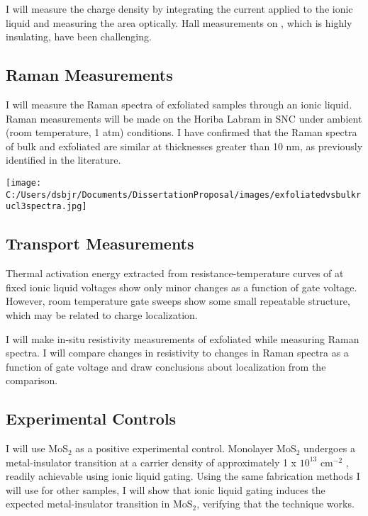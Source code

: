\documentclass[11pt]{article}
\newenvironment{Figure}
  {\par\medskip\noindent\minipage{\linewidth}}
  {\endminipage\par\medskip}
\begin{document}
\begin{multicols}{2}
I will measure the charge density by integrating the current applied to the ionic liquid and measuring the area optically. Hall measurements on \ruclnospace, which is highly insulating, have been challenging.

\subsection{Raman Measurements}

I will measure the Raman spectra of exfoliated \rucl samples through an ionic liquid. Raman measurements will be made on the Horiba Labram in SNC under ambient (room temperature, 1 atm) conditions. I have confirmed that the Raman spectra of bulk and exfoliated \rucl are similar at thicknesses greater than 10 nm, as previously identified in the literature.

\begin{Figure}
		{\texttt{[image: C:/Users/dsbjr/Documents/DissertationProposal/images/exfoliatedvsbulkrucl3spectra.jpg]}\label{fig:f4}}
\end{Figure}

\subsection{Transport Measurements}

Thermal activation energy extracted from resistance-temperature curves of  at fixed ionic liquid voltages show only minor changes as a function of gate voltage. However, room temperature gate sweeps show some small repeatable structure, which may be related to charge localization.

I will make in-situ resistivity measurements of exfoliated  while measuring Raman spectra. I will compare changes in resistivity to changes in Raman spectra as a function of gate voltage and draw conclusions about localization from the comparison.

\subsection{Experimental Controls}

I will use MoS$_{2}$ as a positive experimental control. Monolayer MoS$_{2}$ undergoes a metal-insulator transition at a carrier density of approximately 1 x $10^{13}$ cm$^{-2}$ \cite{Radisavljevic2013}, readily achievable using ionic liquid gating. Using the same fabrication methods I will use for other samples, I will show that ionic liquid gating induces the expected metal-insulator transition in MoS$_{2}$, verifying that the technique works.


\end{multicols}
\end{document}
